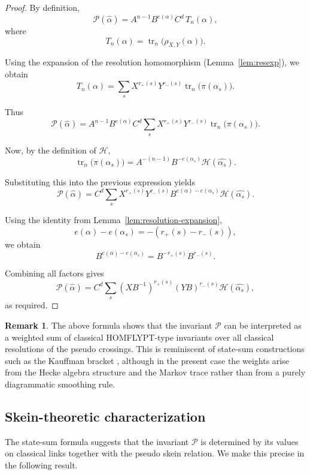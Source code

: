 \documentclass[11pt]{article}
\numberwithin{equation}{section}
\theoremstyle{definition}
\newtheorem{remark}[theorem]{Remark}
\begin{document}
\begin{proof}
By definition,
\[
\mathcal P(\widehat{\alpha})
=
A^{n-1} B^{e(\alpha)} C^d
\, T_n(\alpha),
\]
where
\[
T_n(\alpha)
=
\operatorname{tr}_n\big(\rho_{X,Y}(\alpha)\big).
\]

Using the expansion of the resolution homomorphism (Lemma~\ref{lem:resexp}), we obtain
\[
T_n(\alpha)
=
\sum_s X^{r_+(s)} Y^{r_-(s)} \operatorname{tr}_n\big(\pi(\alpha_s)\big).
\]

Thus
\[
\mathcal P(\widehat{\alpha})
=
A^{n-1} B^{e(\alpha)} C^d
\sum_s
X^{r_+(s)} Y^{r_-(s)}
\operatorname{tr}_n\big(\pi(\alpha_s)\big).
\]

Now, by the definition of \(\mathcal H\),
\[
\operatorname{tr}_n\big(\pi(\alpha_s)\big)
=
A^{-(n-1)} B^{-e(\alpha_s)}
\mathcal H(\widehat{\alpha_s}).
\]

Substituting this into the previous expression yields
\[
\mathcal P(\widehat{\alpha})
=
C^d
\sum_s
X^{r_+(s)} Y^{r_-(s)}
B^{e(\alpha)-e(\alpha_s)}
\mathcal H(\widehat{\alpha_s}).
\]

Using the identity from Lemma~\ref{lem:resolution-expansion},
\[
e(\alpha)-e(\alpha_s) = -(r_+(s)-r_-(s)),
\]
we obtain
\[
B^{e(\alpha)-e(\alpha_s)}
=
B^{-r_+(s)} B^{r_-(s)}.
\]

Combining all factors gives
\[
\mathcal P(\widehat{\alpha})
=
C^d
\sum_s
\left(X B^{-1}\right)^{r_+(s)}
\left(Y B\right)^{r_-(s)}
\mathcal H(\widehat{\alpha_s}),
\]
as required.
\end{proof}

\begin{remark}
The above formula shows that the invariant \(\mathcal P\) can be interpreted as a weighted sum of classical HOMFLYPT-type invariants over all classical resolutions of the pseudo crossings. This is reminiscent of state-sum constructions such as the Kauffman bracket \cite{Kauffman1988}, although in the present case the weights arise from the Hecke algebra structure and the Markov trace rather than from a purely diagrammatic smoothing rule.
\end{remark}


\subsection{Skein-theoretic characterization}

The state-sum formula suggests that the invariant \(\mathcal P\) is determined by its values on classical links together with the pseudo skein relation. We make this precise in the following result.
\end{document}
